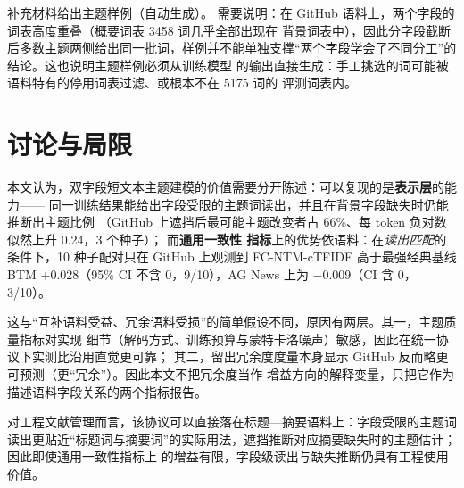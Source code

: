 \documentclass[11pt]{ctexart}
\newcommand{\fcntm}{FC-NTM}
\begin{document}
补充材料给出主题样例（自动生成）。
需要说明：在 GitHub 语料上，两个字段的词表高度重叠（概要词表 3458 词几乎全部出现在
背景词表中），因此分字段截断后多数主题两侧给出同一批词，样例并不能单独支撑“两个字段学会了不同分工”的结论。这也说明主题样例必须从训练模型
的输出直接生成：手工挑选的词可能被语料特有的停用词表过滤、或根本不在 5175 词的
评测词表内。

\section{讨论与局限}

本文认为，双字段短文本主题建模的价值需要分开陈述：可以复现的是\textbf{表示层}的能力——
同一训练结果能给出字段受限的主题词读出，并且在背景字段缺失时仍能推断出主题比例
（GitHub 上遮挡后最可能主题改变者占 66\%、每 token 负对数似然上升 0.24，3 个种子）；
而\textbf{通用一致性
指标}上的优势依语料：在\emph{读出匹配}的条件下，10 种子配对只在 GitHub 上观测到
\fcntm{}-cTFIDF 高于最强经典基线 BTM $+$0.028（95\% CI 不含 0，9/10），AG News 上为
$-$0.009（CI 含 0，3/10）。

这与“互补语料受益、冗余语料受损”的简单假设不同，原因有两层。其一，主题质量指标对实现
细节（解码方式、训练预算与蒙特卡洛噪声）敏感，因此在统一协议下实测比沿用直觉更可靠；
其二，留出冗余度度量本身显示 GitHub 反而略更可预测（更“冗余”）。因此本文不把冗余度当作
增益方向的解释变量，只把它作为描述语料字段关系的两个指标报告。

对工程文献管理而言，该协议可以直接落在标题—摘要语料上：字段受限的主题词读出更贴近“标题词与摘要词”的实际用法，遮挡推断对应摘要缺失时的主题估计；因此即使通用一致性指标上
的增益有限，字段级读出与缺失推断仍具有工程使用价值。
\end{document}
